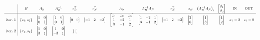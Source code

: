 \begin{equation*}
\scalemath{0.65}{
\begin{array}{ c|c c c c c c c c c c c c c }
 & B & A_{B} & A_{B}^{-1} & c_{B}^{T} & c_{N}^{T} & A_{N} & A_{B}^{-1} A_{N} & r_{N}^{T} & x_{B} & \left( A_{B}^{-1} A_{N}\right)_{i} & \begin{bmatrix}
\vartheta _{1}\\
\vartheta _{2}
\end{bmatrix} & \text{IN} & \text{OUT}\\
\hline
\text{iter.} \ 1 & \{s_{1} ,s_{2}\} & \begin{bmatrix}
1 & 0\\
0 & 1
\end{bmatrix} & \begin{bmatrix}
1 & 0\\
0 & 1
\end{bmatrix} & \begin{bmatrix}
0 & 0
\end{bmatrix} & \begin{bmatrix}
-1 & 2 & -3
\end{bmatrix} & \begin{bmatrix}
x_{1} & x_{2} & x_{3}\\
1 & -2 & 1\\
3 & -1 & 2
\end{bmatrix} & \begin{bmatrix}
1 & -2 & 1\\
3 & -1 & 2
\end{bmatrix} & \begin{bmatrix}
-1 & 2 & -3
\end{bmatrix} & \begin{bmatrix}
2\\
6
\end{bmatrix} & \begin{bmatrix}
1\\
3
\end{bmatrix} & \begin{bmatrix}
1\\
2
\end{bmatrix} & x_{1} =2 & s_{1} =0\\
\text{iter.} \ 2 & \{x_{1} ,s_{2}\} & \begin{bmatrix}
1 & 0\\
3 & 1
\end{bmatrix} & \begin{bmatrix}
1 & 0\\
-3 & 1
\end{bmatrix} & \begin{bmatrix}

\end{bmatrix}
\end{array}}
\end{equation*}
